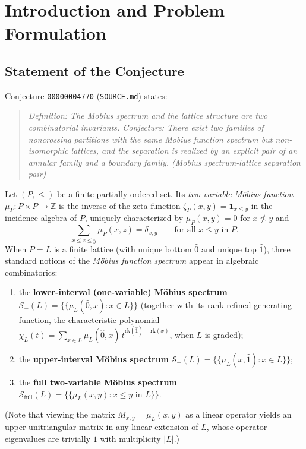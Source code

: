 \documentclass[11pt]{article}
\theoremstyle{definition}
\newcommand{\rk}{\mathrm{rk}}
\begin{document}
\section{Introduction and Problem Formulation}

\subsection{Statement of the Conjecture}
Conjecture \texttt{00000004770} (\texttt{SOURCE.md}) states:
\begin{quote}
\emph{Definition: The Mobius spectrum and the lattice structure are two combinatorial invariants. Conjecture: There exist two families of noncrossing partitions with the same Mobius function spectrum but non-isomorphic lattices, and the separation is realized by an explicit pair of an annular family and a boundary family. (Mobius spectrum-lattice separation pair)}
\end{quote}

Let $(P, \le)$ be a finite partially ordered set. Its \emph{two-variable M\"obius function} $\mu_P : P \times P \to \mathbb{Z}$ is the inverse of the zeta function $\zeta_P(x,y) = \mathbf{1}_{x \le y}$ in the incidence algebra of $P$, uniquely characterized by $\mu_P(x,y) = 0$ for $x \not\le y$ and
\begin{equation}\label{eq:mobius-def}
  \sum_{x \le z \le y} \mu_P(x, z) = \delta_{x, y} \qquad \text{for all } x \le y \text{ in } P.
\end{equation}
When $P = L$ is a finite lattice (with unique bottom $\hat{0}$ and unique top $\hat{1}$), three standard notions of the \emph{M\"obius function spectrum} appear in algebraic combinatorics:
\begin{enumerate}
  \item the \textbf{lower-interval (one-variable) M\"obius spectrum} $\mathcal{S}_-(L) = \{\!\{\mu_L(\hat{0}, x) : x \in L\}\!\}$ (together with its rank-refined generating function, the characteristic polynomial $\chi_L(t) = \sum_{x \in L} \mu_L(\hat{0}, x)\, t^{\rk(\hat{1}) - \rk(x)}$, when $L$ is graded);
  \item the \textbf{upper-interval M\"obius spectrum} $\mathcal{S}_+(L) = \{\!\{\mu_L(x, \hat{1}) : x \in L\}\!\}$;
  \item the \textbf{full two-variable M\"obius spectrum} $\mathcal{S}_{\mathrm{full}}(L) = \{\!\{\mu_L(x, y) : x \le y \text{ in } L\}\!\}$.
\end{enumerate}
(Note that viewing the matrix $M_{x,y} = \mu_L(x,y)$ as a linear operator yields an upper unitriangular matrix in any linear extension of $L$, whose operator eigenvalues are trivially $1$ with multiplicity $|L|$.)
\end{document}
